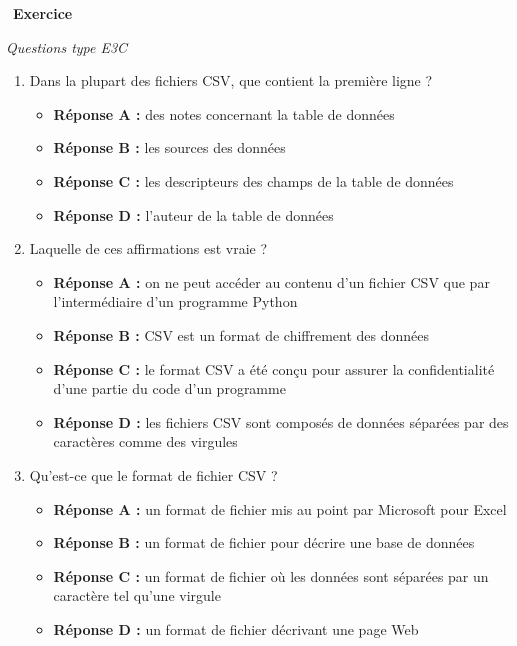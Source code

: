 \documentclass[
  11pt,
]{article}
\providecommand{\tightlist}{%
  \setlength{\itemsep}{0pt}\setlength{\parskip}{0pt}}
\newcounter{exo}
\newenvironment{exercice}[1]
{\par \medskip   \addtocounter{exo}{1} \noindent  
\begin{bclogo}[arrondi =0.1,   noborder = true, logo=\bccrayon, marge=4]{~\textbf{Exercice} \textbf{\theexo} {\itshape #1} }  \par}
{
\end{bclogo}
 \par \bigskip }
\newcounter{def}
\newcounter{prog}
\begin{document}
\begin{exercice}{}

\emph{Questions type E3C}

\begin{enumerate}
\def\labelenumi{\arabic{enumi}.}
\item
  Dans la plupart des fichiers CSV, que contient la première ligne ?

  \begin{itemize}
  \tightlist
  \item
    \textbf{Réponse A :} des notes concernant la table de données
  \item
    \textbf{Réponse B :} les sources des données
  \item
    \textbf{Réponse C :} les descripteurs des champs de la table de
    données
  \item
    \textbf{Réponse D :} l'auteur de la table de données
  \end{itemize}
\item
  Laquelle de ces affirmations est vraie ?

  \begin{itemize}
  \tightlist
  \item
    \textbf{Réponse A :} on ne peut accéder au contenu d'un fichier CSV
    que par l'intermédiaire d'un programme Python
  \item
    \textbf{Réponse B :} CSV est un format de chiffrement des données
  \item
    \textbf{Réponse C :} le format CSV a été conçu pour assurer la
    confidentialité d'une partie du code d'un programme
  \item
    \textbf{Réponse D :} les fichiers CSV sont composés de données
    séparées par des caractères comme des virgules
  \end{itemize}
\item
  Qu'est-ce que le format de fichier CSV ?

  \begin{itemize}
  \tightlist
  \item
    \textbf{Réponse A :} un format de fichier mis au point par Microsoft
    pour Excel
  \item
    \textbf{Réponse B :} un format de fichier pour décrire une base de
    données
  \item
    \textbf{Réponse C :} un format de fichier où les données sont
    séparées par un caractère tel qu'une virgule
  \item
    \textbf{Réponse D :} un format de fichier décrivant une page Web
  \end{itemize}
\end{enumerate}

\end{exercice}
\end{document}
